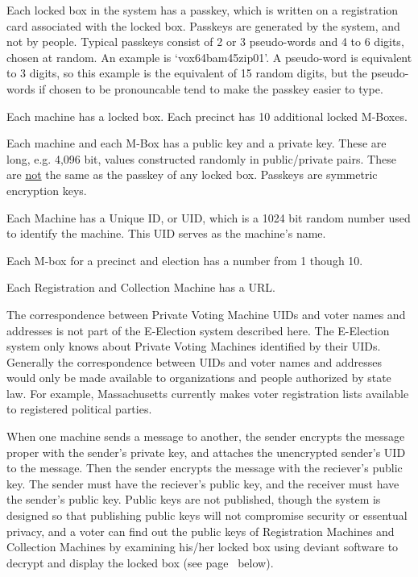 \documentclass[12pt]{article}
\newcommand{\pagref}[1]{(see page~\pageref{#1} below)}
\begin{document}
Each locked box in the system has a passkey, which is
written on a registration card associated with the locked
box.  Passkeys are generated by the system, and not by
people.  Typical passkeys consist of 2 or 3 pseudo-words
and 4 to 6 digits, chosen at random.  An example is
`vox64bam45zip01'.  A pseudo-word is equivalent to 3
digits, so this example is the equivalent of 15 random
digits, but the pseudo-words if chosen to be pronouncable
tend to make the passkey easier to type.

Each machine has a locked box.  Each precinct
has 10 additional locked M-Boxes.

Each machine and each M-Box has a public key and a private key.  These
are long, e.g. 4,096 bit, values constructed randomly
in public/private pairs.
These are \underline{not} the same as the passkey of any locked box.
Passkeys are symmetric encryption keys.

Each Machine
has a Unique ID, or UID, which is a 1024 bit random number
used to identify the machine.  This UID serves as the
machine's name.

Each M-box for a precinct and election has a number from 1 though 10.

Each Registration and Collection Machine has a URL.

The correspondence between Private Voting Machine UIDs
and voter names and addresses is not part of the E-Election system
described here.  The E-Election system only knows about
Private Voting Machines identified by their UIDs.
Generally the correspondence between UIDs and voter names and addresses
would only be made available
to organizations and people authorized by state law.
For example, Massachusetts currently makes voter registration lists
available to registered political parties.

When one machine sends a message to another, the sender
encrypts the message proper with the sender's private
key, and attaches the unencrypted sender's UID to the
message.  Then the sender encrypts the message with the
reciever's public key.  The sender must have the reciever's
public key, and the receiver must have the sender's public
key.  Public keys are not published,
though the system is designed so that publishing public
keys will not compromise security or essentual privacy,
and a voter can find out the public keys of Registration
Machines and Collection Machines by examining his/her locked
box using deviant software to decrypt and
display the locked box \pagref{DEVIANT-SOFTWARE}.
\end{document}
